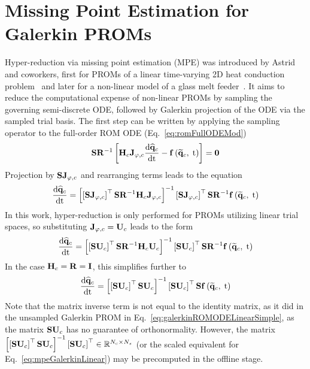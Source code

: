 
\section{Missing Point Estimation for Galerkin PROMs}

Hyper-reduction via missing point estimation (MPE) was introduced by Astrid and coworkers, first for PROMs of a linear time-varying 2D heat conduction problem~\cite{Astrid2004} and later for a non-linear model of a glass melt feeder~\cite{Astrid2008}. It aims to reduce the computational expense of non-linear PROMs by sampling the governing semi-discrete ODE, followed by Galerkin projection of the ODE via the sampled trial basis. The first step can be written by applying the sampling operator to the full-order ROM ODE (Eq.~\ref{eq:romFullODEMod})
%
\begin{equation}
    \sampMat \resScaleInv \left[\jacobDecodeCons \ode{\consVecCoef}{\timeVar} - \rhsFunc{\consVecRom, \; \timeVar}\right] = \zeroVec
\end{equation}
%
Projection by $\mathbf{S} \mathbf{J}_{\varphi,c}$ and rearranging terms leads to the equation
%
\begin{equation}
	\ode{\consVecCoef}{\timeVar} = \left[ \left[\sampMat \jacobTrialCons\right]^\top \sampMat \resScaleInv \jacobDecodeCons\right]^{-1} \left[\sampMat \jacobTrialCons\right]^\top \sampMat \resScaleInv \rhsFunc{\consVecRom, \; \timeVar}
\end{equation}
%
In this work, hyper-reduction is only performed for PROMs utilizing linear trial spaces, so substituting $\jacobTrialCons = \consTrial$ leads to the form
%
\begin{equation}\label{eq:mpeGalerkinLinear}
	\ode{\consVecCoef}{\timeVar} = \left[ \left[\sampMat \consTrial \right]^\top \sampMat \resScaleInv \consScale \consTrial \right]^{-1} \left[\sampMat \consTrial \right]^\top \sampMat \resScaleInv \rhsFunc{\consVecRom, \; \timeVar}
\end{equation}
%
In the case $\consScale = \resScale = \identMat$, this simplifies further to
%
\begin{equation}
	\ode{\consVecCoef}{\timeVar} = \left[ \left[\sampMat \consTrial \right]^\top \sampMat \consTrial \right]^{-1} \left[\sampMat \consTrial \right]^\top \sampMat \rhsFunc{\consVecRom, \; \timeVar}
\end{equation}
%
Note that the matrix inverse term is not equal to the identity matrix, as it did in the unsampled Galerkin PROM in Eq.~\ref{eq:galerkinROMODELinearSimple}, as the matrix $\sampMat \consTrial$ has no guarantee of orthonormality. However, the matrix $\left[ \left[\sampMat \consTrial \right]^\top \sampMat \consTrial \right]^{-1} \left[\sampMat \consTrial \right]^\top \inRTwo{\numConsModes}{\numSamps}$ (or the scaled equivalent for Eq.~\ref{eq:mpeGalerkinLinear}) may be precomputed in the offline stage.

